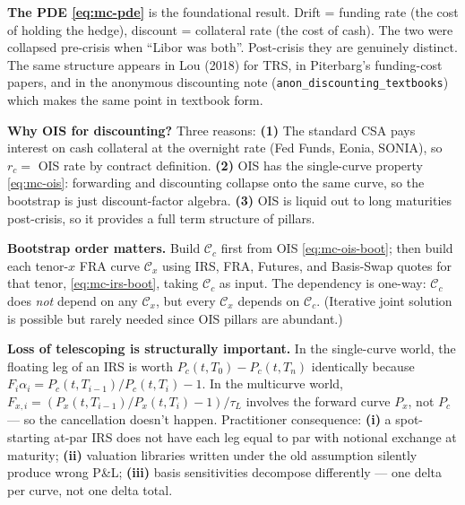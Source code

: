 \documentclass[11pt,a4paper]{article}
\begin{document}
\begin{commentary}
\textbf{The PDE \eqref{eq:mc-pde}} is the foundational result.
Drift = funding rate (the cost of holding the hedge),
discount = collateral rate (the cost of cash). The two were
collapsed pre-crisis when ``Libor was both''. Post-crisis they are
genuinely distinct. The same structure appears in Lou (2018) for
TRS, in Piterbarg's funding-cost papers, and in the anonymous
discounting note (\texttt{anon\_discounting\_textbooks}) which makes
the same point in textbook form.
\end{commentary}

\begin{commentary}
\textbf{Why OIS for discounting?} Three reasons:
\textbf{(1)} The standard CSA pays interest on cash collateral at the
overnight rate (Fed Funds, Eonia, SONIA), so $r_c =$ OIS rate by
contract definition. \textbf{(2)} OIS has the single-curve property
\eqref{eq:mc-ois}: forwarding and discounting collapse onto the same
curve, so the bootstrap is just discount-factor algebra.
\textbf{(3)} OIS is liquid out to long maturities post-crisis,
so it provides a full term structure of pillars.
\end{commentary}

\begin{commentary}
\textbf{Bootstrap order matters.} Build $\mathcal{C}_c$ first from
OIS \eqref{eq:mc-ois-boot}; then build each tenor-$x$ FRA curve
$\mathcal{C}_x$ using IRS, FRA, Futures, and Basis-Swap quotes for
that tenor, \eqref{eq:mc-irs-boot}, taking $\mathcal{C}_c$ as input.
The dependency is one-way: $\mathcal{C}_c$ does \emph{not} depend
on any $\mathcal{C}_x$, but every $\mathcal{C}_x$ depends on
$\mathcal{C}_c$. (Iterative joint solution is possible but rarely
needed since OIS pillars are abundant.)
\end{commentary}

\begin{commentary}
\textbf{Loss of telescoping is structurally important.} In the
single-curve world, the floating leg of an IRS is worth $P_c(t, T_0) -
P_c(t, T_n)$ identically because $F_i \alpha_i = P_c(t, T_{i-1})/P_c(t, T_i) - 1$.
In the multicurve world, $F_{x,i} = (P_x(t, T_{i-1})/P_x(t, T_i) - 1)/\tau_L$
involves the forward curve $P_x$, not $P_c$ --- so the cancellation
doesn't happen. Practitioner consequence: \textbf{(i)} a spot-starting
at-par IRS does not have each leg equal to par with notional exchange
at maturity; \textbf{(ii)} valuation libraries written under the
old assumption silently produce wrong P\&L; \textbf{(iii)} basis
sensitivities decompose differently --- one delta per curve, not
one delta total.
\end{commentary}
\end{document}
